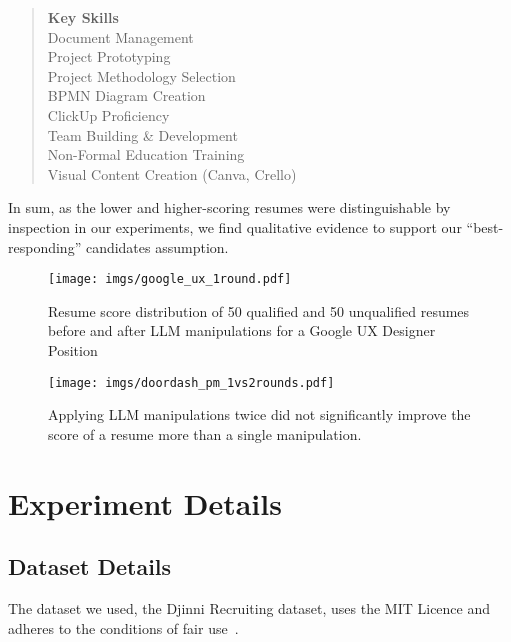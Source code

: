 \begin{quote}
        \textbf{Key Skills} \\
        Document Management \\
        Project Prototyping \\
        Project Methodology Selection \\
        BPMN Diagram Creation \\
        ClickUp Proficiency \\
        Team Building \& Development \\
        Non-Formal Education Training \\
        Visual Content Creation (Canva, Crello)
    \end{quote}
    
    In sum, as the lower and higher-scoring resumes were distinguishable by inspection in our experiments, we find qualitative evidence to support our ``best-responding'' candidates assumption. 
\begin{figure}
    \centering
    \texttt{[image: imgs/google\_ux\_1round.pdf]}
    \caption{ Resume score distribution of 50 qualified and 50 unqualified resumes before and after LLM manipulations for a Google UX Designer Position}
    \label{fig:ux-pm}
\end{figure}

\begin{figure}[!tbp]
    \centering
    \texttt{[image: imgs/doordash\_pm\_1vs2rounds.pdf]}
    \caption{Applying LLM manipulations twice did not significantly improve the score of a resume more than a single manipulation.}
    \label{fig:1vs2manipu}
\end{figure}

\section{Experiment Details}
    \label{app:experiment-details}
    \subsection{Dataset Details}
    The dataset we used, the Djinni Recruiting dataset, uses the MIT Licence and adheres to the conditions of fair use~\citep{drushchak-romanyshyn-2024-introducing}. 

